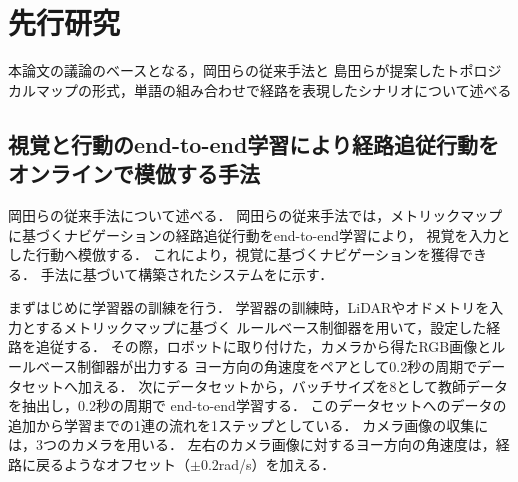 \chapter{先行研究}
\label{chap:prior}
本論文の議論のベースとなる，岡田らの従来手法と
島田らが提案したトポロジカルマップの形式，単語の組み合わせで経路を表現したシナリオについて述べる

\section{視覚と行動のend-to-end学習により経路追従行動を
オンラインで模倣する手法}
岡田らの従来手法について述べる．
岡田らの従来手法では，メトリックマップに基づくナビゲーションの経路追従行動をend-to-end学習により，
視覚を入力とした行動へ模倣する．
これにより，視覚に基づくナビゲーションを獲得できる．
手法に基づいて構築されたシステムをに示す．

まずはじめに学習器の訓練を行う．
学習器の訓練時，LiDARやオドメトリを入力とするメトリックマップに基づく
ルールベース制御器を用いて，設定した経路を追従する．
その際，ロボットに取り付けた，カメラから得たRGB画像とルールベース制御器が出力する
ヨー方向の角速度をペアとして0.2秒の周期でデータセットへ加える．
次にデータセットから，バッチサイズを8として教師データを抽出し，0.2秒の周期で
end-to-end学習する．
このデータセットへのデータの追加から学習までの1連の流れを1ステップとしている．
カメラ画像の収集には，3つのカメラを用いる．
左右のカメラ画像に対するヨー方向の角速度は，経路に戻るようなオフセット（\(\pm 0.2\)rad/s）を加える．

